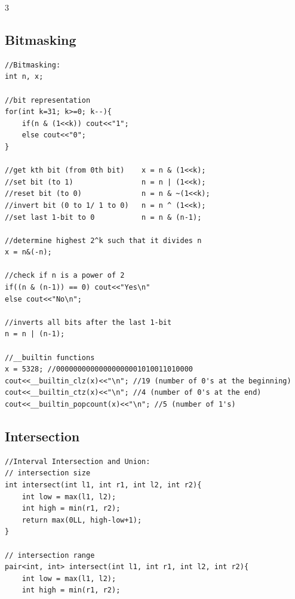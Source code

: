 \documentclass[twoside]{article}
\begin{document}
\begin{multicols*}{3}
{
\subsection*{Bitmasking}
}
\begin{verbatim}
//Bitmasking:
int n, x;

//bit representation
for(int k=31; k>=0; k--){
    if(n & (1<<k)) cout<<"1";
    else cout<<"0";
}

//get kth bit (from 0th bit)    x = n & (1<<k);
//set bit (to 1)                n = n | (1<<k);
//reset bit (to 0)              n = n & ~(1<<k);
//invert bit (0 to 1/ 1 to 0)   n = n ^ (1<<k);
//set last 1-bit to 0           n = n & (n-1);

//determine highest 2^k such that it divides n
x = n&(-n);

//check if n is a power of 2
if((n & (n-1)) == 0) cout<<"Yes\n"
else cout<<"No\n";

//inverts all bits after the last 1-bit
n = n | (n-1);

//__builtin functions
x = 5328; //00000000000000000001010011010000
cout<<__builtin_clz(x)<<"\n"; //19 (number of 0's at the beginning)
cout<<__builtin_ctz(x)<<"\n"; //4 (number of 0's at the end)
cout<<__builtin_popcount(x)<<"\n"; //5 (number of 1's)
\end{verbatim}

{
\subsection*{Intersection}
}
\begin{verbatim}
//Interval Intersection and Union:
// intersection size
int intersect(int l1, int r1, int l2, int r2){
    int low = max(l1, l2);
    int high = min(r1, r2);
    return max(0LL, high-low+1);
}

// intersection range
pair<int, int> intersect(int l1, int r1, int l2, int r2){
    int low = max(l1, l2);
    int high = min(r1, r2);


\end{verbatim}
\end{multicols*}
\end{document}
